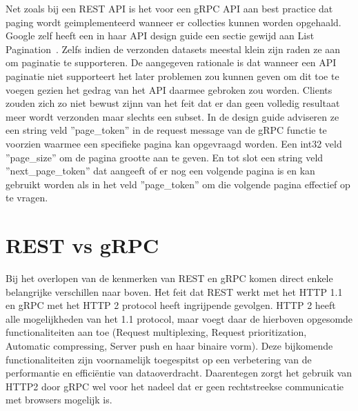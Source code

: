 Net zoals bij een REST API is het voor een gRPC API aan best practice dat paging wordt geimplementeerd wanneer er collecties kunnen worden opgehaald.
Google zelf heeft een in haar API design guide een sectie gewijd aan List Pagination~\parencite{googlepaging}. Zelfs indien de verzonden datasets meestal
klein zijn raden ze aan om paginatie te supporteren. De aangegeven rationale is dat wanneer een API paginatie niet supporteert het later
problemen zou kunnen geven om dit toe te voegen gezien het gedrag van het API daarmee gebroken zou worden. Clients zouden zich zo niet bewust zijnn van het feit
dat er dan geen volledig resultaat meer wordt verzonden maar slechts een subset. In de design guide adviseren ze een string veld ''page\_token'' in de request message
van de gRPC functie te voorzien waarmee een specifieke pagina kan opgevraagd worden. Een int32  veld ''page\_size'' om de pagina grootte aan te geven.
En tot slot een string veld  ''next\_page\_token'' dat aangeeft of er nog een volgende pagina is en kan gebruikt worden als in het veld ''page\_token''
om die volgende pagina effectief op te vragen.\newline
~\autocite{grpcversion}\\

\section{REST vs gRPC}

Bij het overlopen van de kenmerken van REST en gRPC komen direct enkele belangrijke verschillen naar boven.
Het feit dat REST werkt met het HTTP 1.1 en gRPC met het HTTP 2 protocol heeft ingrijpende gevolgen. HTTP 2 heeft alle mogelijkheden van het 1.1 protocol,
maar voegt daar de hierboven opgesomde functionaliteiten aan toe (Request multiplexing, Request prioritization, Automatic compressing,
Server push en haar binaire vorm). Deze bijkomende functionaliteiten zijn voornamelijk toegespitst op een verbetering van de performantie en effici\"entie van dataoverdracht.
Daarentegen zorgt het gebruik van HTTP2 door gRPC wel voor het nadeel dat er geen rechtstreekse communicatie met browsers mogelijk is.\newline
~\autocite{cloudflare}\\
~\autocite{tutsplus}\\


